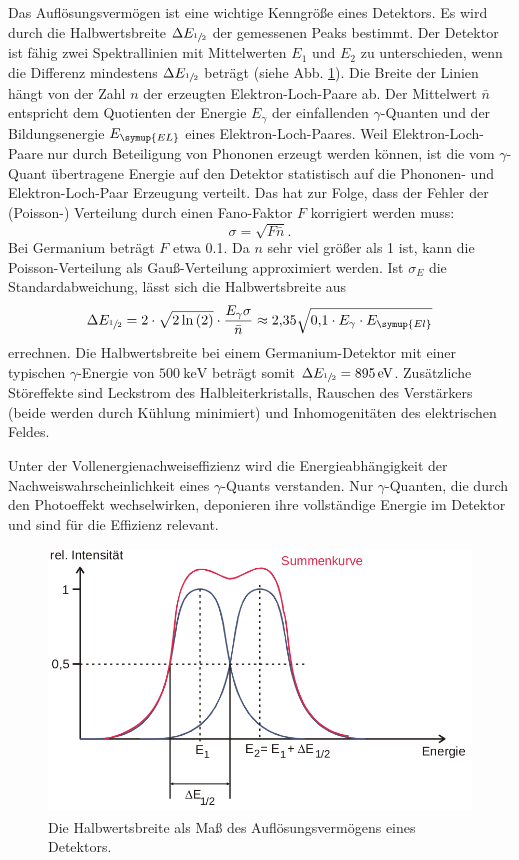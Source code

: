 Das Auflösungsvermögen ist eine wichtige Kenngröße eines Detektors.
Es wird durch die Halbwertsbreite $\Delta E_{\sfrac{1}{2}}$ der gemessenen Peaks bestimmt.
Der Detektor ist fähig zwei Spektrallinien mit Mittelwerten $E_1$ und $E_2$ zu unterschieden, wenn die Differenz mindestens $\Delta E_{\sfrac{1}{2}}$ beträgt (siehe Abb. \ref{fig:Breite}).
Die Breite der Linien hängt von der Zahl $n$ der erzeugten Elektron-Loch-Paare ab.
Der Mittelwert $\bar{n}$ entspricht dem Quotienten der Energie $E_{\gamma}$ der einfallenden $\gamma$-Quanten und der Bildungsenergie $E_{\symup{EL}}$ eines Elektron-Loch-Paares.
Weil Elektron-Loch-Paare nur durch Beteiligung von Phononen erzeugt werden können, ist die vom $\gamma$-Quant übertragene Energie auf den Detektor statistisch auf die Phononen- und Elektron-Loch-Paar Erzeugung verteilt.
Das hat zur Folge, dass der Fehler der (Poisson-) Verteilung durch einen Fano-Faktor $F$ korrigiert werden muss:
\begin{equation*}
\sigma = \sqrt{F\bar{n}}.
\end{equation*}
Bei Germanium beträgt $F$ etwa \num{0.1}.
Da $n$ sehr viel größer als \num{1} ist, kann die Poisson-Verteilung als Gauß-Verteilung approximiert werden.
Ist $\sigma_E$ die Standardabweichung, lässt sich die Halbwertsbreite aus
\begin{equation}
\label{eq:aufloesung}
\Delta E_{\sfrac{1}{2}} = 2 \cdot \sqrt{2\ln{(2)}}\cdot\frac{E_{\gamma}\sigma}{\bar{n}} \approx \num{2.35}\sqrt{\num{0.1} \cdot E_\gamma \cdot E_{\symup{El}}}
\end{equation}
errechnen.
Die Halbwertsbreite bei einem Germanium-Detektor mit einer typischen $\gamma$-Energie von $\SI{500}{\kilo\electronvolt}$ beträgt somit $\Delta E_{\sfrac{1}{2}} =\SI{895}{\electronvolt}$.
Zusätzliche Störeffekte sind Leckstrom des Halbleiterkristalls, Rauschen des Verstärkers (beide werden durch Kühlung minimiert) und Inhomogenitäten des elektrischen Feldes.

Unter der Vollenergienachweiseffizienz wird die Energieabhängigkeit der Nachweiswahrscheinlichkeit eines $\gamma$-Quants verstanden.
Nur $\gamma$-Quanten, die durch den Photoeffekt wechselwirken, deponieren ihre vollständige Energie im Detektor und sind für die Effizienz relevant.

 \begin{figure}
   \centering
   \includegraphics[height=7cm]{content/pictures/Breite.png}
   \caption{Die Halbwertsbreite als Maß des Auflösungsvermögens eines Detektors.\cite{V18}}
   \label{fig:Breite}
 \end{figure}

